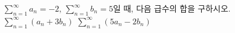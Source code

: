 $\displaystyle\sum_{n=1}^{\infty} a_n=-2$, $\displaystyle\sum_{n=1}^{\infty} b_n=5$일 때, 다음 급수의 합을 구하시오.
 $\displaystyle\sum_{n=1}^{\infty}(a_n+3b_n)$
 $\displaystyle\sum_{n=1}^{\infty}(5a_n-2b_n)$

